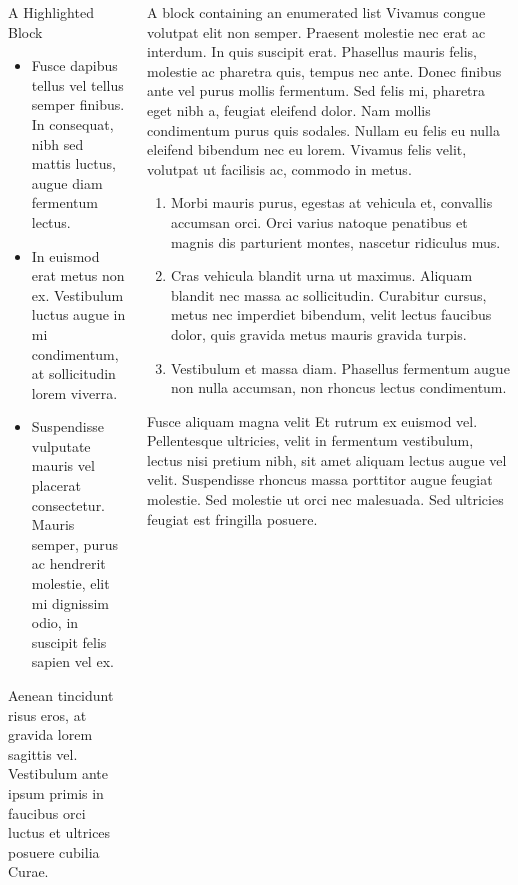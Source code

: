 \documentclass[final]{beamer}
\newlength{\sepwidth}
\newcommand{\separatorcolumn}{\begin{column}{\sepwidth}\end{column}}
\begin{document}
\begin{frame}[label={sec:org5a641b0}]{}
\begin{columns}
\begin{column}{0.3\columnwidth}
\begin{alertblock}{A Highlighted Block}
\begin{itemize}
\item \alert{Fusce dapibus tellus} vel tellus semper finibus. In consequat, nibh sed
mattis luctus, augue diam fermentum lectus.
\item \alert{In euismod erat metus} non ex. Vestibulum luctus augue in
mi condimentum, at sollicitudin lorem viverra.
\item \alert{Suspendisse vulputate} mauris vel placerat consectetur.  Mauris semper, purus
ac hendrerit molestie, elit mi dignissim odio, in suscipit felis sapien vel
ex.
\end{itemize}

Aenean tincidunt risus eros, at gravida lorem sagittis vel. Vestibulum ante
ipsum primis in faucibus orci luctus et ultrices posuere cubilia Curae.

\end{alertblock}
\end{column}

\begin{column}{0.3\columnwidth}
\begin{block}{A block containing an enumerated list}
Vivamus congue volutpat elit non semper. Praesent molestie nec erat ac
interdum. In quis suscipit erat. \alert{Phasellus mauris felis, molestie ac pharetra
quis}, tempus nec ante. Donec finibus ante vel purus mollis fermentum. Sed felis
mi, pharetra eget nibh a, feugiat eleifend dolor. Nam mollis condimentum purus
quis sodales. Nullam eu felis eu nulla eleifend bibendum nec eu lorem. Vivamus
felis velit, volutpat ut facilisis ac, commodo in metus.

\begin{enumerate}
\item \alert{Morbi mauris purus}, egestas at vehicula et, convallis accumsan orci. Orci
varius natoque penatibus et magnis dis parturient montes, nascetur ridiculus
mus.
\item \alert{Cras vehicula blandit urna ut maximus}. Aliquam blandit nec massa ac
sollicitudin. Curabitur cursus, metus nec imperdiet bibendum, velit lectus
faucibus dolor, quis gravida metus mauris gravida turpis.
\item \alert{Vestibulum et massa diam}. Phasellus fermentum augue non nulla accumsan, non
rhoncus lectus condimentum.
\end{enumerate}
\end{block}

\begin{block}{Fusce aliquam magna velit}
Et rutrum ex euismod vel. Pellentesque ultricies, velit in fermentum
vestibulum, lectus nisi pretium nibh, sit amet aliquam lectus augue vel
velit. Suspendisse rhoncus massa porttitor augue feugiat molestie. Sed
molestie ut orci nec malesuada. Sed ultricies feugiat est fringilla
posuere.


\end{block}
\end{column}
\end{columns}
\end{frame}
\end{document}
